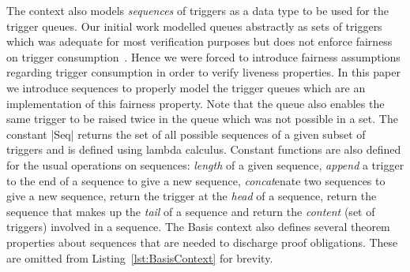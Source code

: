 The context also models \emph{sequences} of triggers as a data type to be used for the trigger queues.
Our initial work modelled queues abstractly as sets of triggers which was adequate for most verification purposes but does not enforce fairness on trigger consumption~\cite{MoSnHo18,MoSnHo-ABZ2020,detect2020}. 
Hence we were forced to introduce fairness assumptions regarding trigger consumption in order to verify liveness properties.
In this paper we introduce sequences to properly model the trigger queues which are an implementation of this fairness property. 
Note that the queue also enables the same trigger to be raised twice in the queue which was not possible in a set.
The constant |Seq| returns the set of all possible sequences of a given subset of triggers and is defined using lambda calculus.
Constant functions are also defined for the usual operations on sequences: 
\emph{length} of a given sequence, 
\emph{append} a trigger to the end of a sequence to give a new sequence, 
\emph{concat}enate two sequences to give a new sequence, 
return the trigger at the \emph{head} of a sequence, 
return the sequence that makes up the \emph{tail} of a sequence and 
return the \emph{content} (set of triggers) involved in a sequence. 
The Basis context also defines several theorem properties about sequences that are needed to discharge proof obligations.
These are omitted from Listing~\ref{lst:BasisContext} for brevity.

\newcommand*{\Comment}[1]{\color{green!50!black}\hfill\makebox[0.6\textwidth][l]{#1}}%

